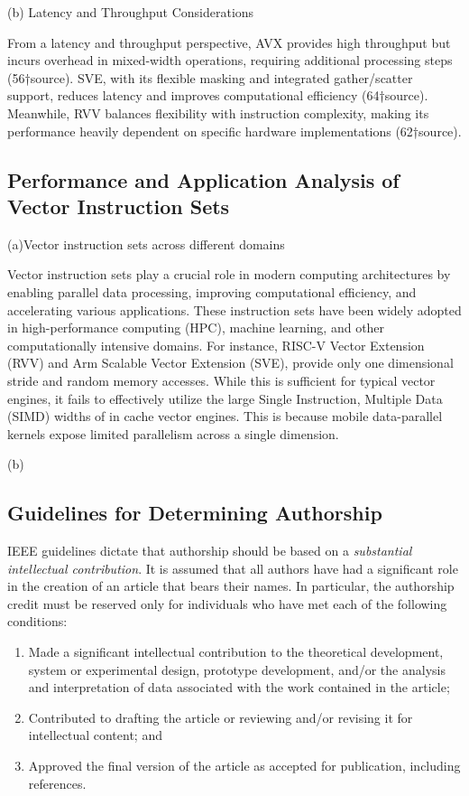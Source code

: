 \documentclass[conference]{IEEEtran}
\begin{document}
(b) Latency and Throughput Considerations

From a latency and throughput perspective, AVX provides high throughput but incurs overhead in mixed-width operations, requiring additional processing steps (56†source). SVE, with its flexible masking and integrated gather/scatter support, reduces latency and improves computational efficiency (64†source). Meanwhile, RVV balances flexibility with instruction complexity, making its performance heavily dependent on specific hardware implementations (62†source).


\subsection{Performance and Application Analysis of Vector Instruction Sets}

(a)Vector instruction sets across different domains

Vector instruction sets play a crucial role in modern computing architectures by enabling parallel data processing, improving computational efficiency, and accelerating various applications. These instruction sets have been widely adopted in high-performance computing (HPC), machine learning, and other computationally intensive domains. For instance, RISC-V Vector Extension (RVV) and Arm Scalable Vector Extension (SVE), provide only one dimensional stride and random memory accesses. While this is sufficient for typical vector engines, it fails to effectively utilize the large Single Instruction, Multiple Data (SIMD) widths of in cache vector engines. This is because mobile data-parallel kernels expose limited parallelism across a single dimension.

(b)


\subsection{Guidelines for Determining Authorship}
IEEE guidelines dictate that authorship should be based on a {\em
  substantial intellectual contribution}. It is assumed that all
authors have had a significant role in the creation of an article that
bears their names. In particular, the authorship credit must be
reserved only for individuals who have met each of the following
conditions:

\begin{enumerate}
\item Made a significant intellectual contribution to the theoretical
  development, system or experimental design, prototype development,
  and/or the analysis and interpretation of data associated with the
  work contained in the article;

\item Contributed to drafting the article or reviewing and/or revising
  it for intellectual content; and

\item Approved the final version of the article as accepted for publication, including references.
\end{enumerate}
\end{document}

